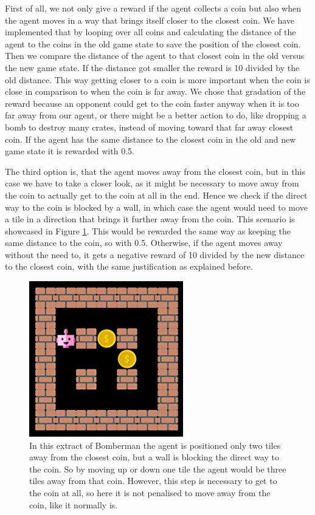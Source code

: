 \noindent First of all, we not only give a reward if the agent collects a coin but also when the agent moves in a way that brings itself closer to the closest coin. We have implemented that by looping over all coins and calculating the distance of the agent to the coins in the old game state to save the position of the closest coin. Then we compare the distance of the agent to that closest coin in the old versus the new game state. If the distance got smaller the reward is 10 divided by the old distance. This way getting closer to a coin is more important when the coin is close in comparison to when the coin is far away. We chose that gradation of the reward because an opponent could get to the coin faster anyway when it is too far away from our agent, or there might be a better action to do, like dropping a bomb to destroy many crates, instead of moving toward that far away closest coin. If the agent has the same distance to the closest coin in the old and new game state it is rewarded with 0.5. 

The third option is, that the agent moves away from the closest coin, but in this case we have to take a closer look, as it might be necessary to move away from the coin to actually get to the coin at all in the end. Hence we check if the direct way to the coin is blocked by a wall, in which case the agent would need to move a tile in a direction that brings it further away from the coin. This scenario is showcased in Figure \ref{fig:coin-blocked}. This would be rewarded the same way as keeping the same distance to the coin, so with 0.5. Otherwise, if the agent moves away without the need to, it gets a negative reward of 10 divided by the new distance to the closest coin, with the same justification as explained before.

\begin{figure}[H]
	\centering
	\includegraphics{images/coin_blocked.png}
	\caption{In this extract of Bomberman the agent is positioned only two tiles away from the closest coin, but a wall is blocking the direct way to the coin. So by moving up or down one tile the agent would be three tiles away from that coin. However, this step is necessary to get to the coin at all, so here it is not penalised to move away from the coin, like it normally is.}
	\label{fig:coin-blocked}
\end{figure}

